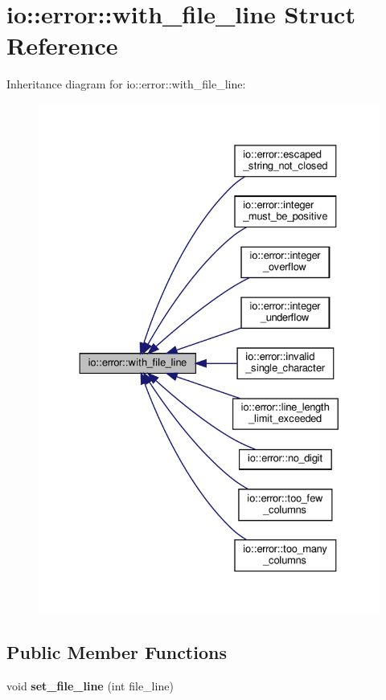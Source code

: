 \hypertarget{structio_1_1error_1_1with__file__line}{}\section{io\+:\+:error\+:\+:with\+\_\+file\+\_\+line Struct Reference}
\label{structio_1_1error_1_1with__file__line}


Inheritance diagram for io\+:\+:error\+:\+:with\+\_\+file\+\_\+line\+:\nopagebreak
\begin{figure}[H]
\begin{center}
\leavevmode
\includegraphics[width=330pt]{structio_1_1error_1_1with__file__line__inherit__graph}
\end{center}
\end{figure}
\subsection*{Public Member Functions}
\begin{DoxyCompactItemize}
\item 
\mbox{\label{structio_1_1error_1_1with__file__line_aa92778a81778abc676ec6ee9952bba8c}} 
void {\bfseries set\+\_\+file\+\_\+line} (int file\+\_\+line)
\end{DoxyCompactItemize}
